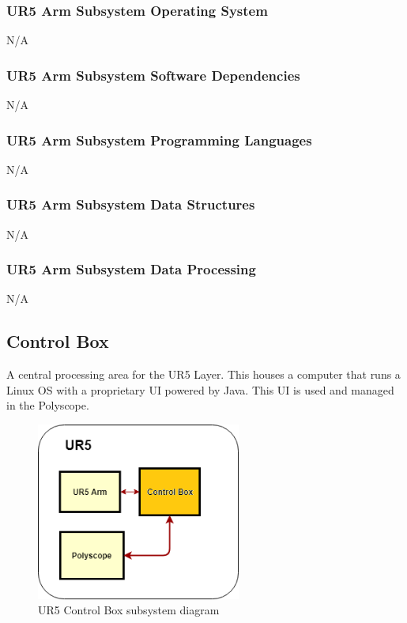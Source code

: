\subsubsection{UR5 Arm Subsystem Operating System}
N/A

\subsubsection{UR5 Arm Subsystem Software Dependencies}
N/A

\subsubsection{UR5 Arm Subsystem Programming Languages}
N/A

\subsubsection{UR5 Arm Subsystem Data Structures}
N/A

\subsubsection{UR5 Arm Subsystem Data Processing}
N/A

\subsection{Control Box}
A central processing area for the UR5 Layer. This houses a computer that runs a Linux OS with a proprietary UI powered by Java. This UI is used and managed in the Polyscope.

\begin{figure}[h!]
	\centering
 	\includegraphics[width=0.60\textwidth]{images/UR5_Layer_Control_Box}
 \caption{UR5 Control Box subsystem diagram}
\end{figure}

